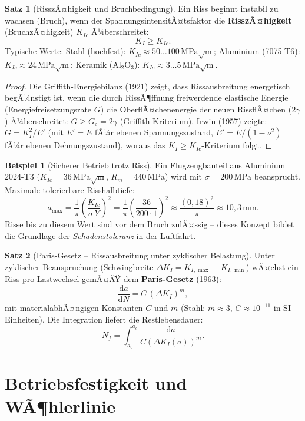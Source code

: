 ﻿\documentclass[a4paper,12pt]{report}
\theoremstyle{definition}
\newtheorem{beispiel}{Beispiel}
\newtheorem{satz}{Satz}
\begin{document}
\begin{satz}[RisszÃ¤higkeit und Bruchbedingung]
Ein Riss beginnt instabil zu wachsen (Bruch), wenn der
SpannungsintensitÃ¤tsfaktor die \textbf{RisszÃ¤higkeit} (BruchzÃ¤higkeit) $K_{Ic}$
Ã¼berschreitet:
\[
  K_I \ge K_{Ic}.
\]
Typische Werte: Stahl (hochfest): $K_{Ic} \approx 50\ldots100\,\mathrm{MPa\sqrt{m}}$;
Aluminium (7075-T6): $K_{Ic} \approx 24\,\mathrm{MPa\sqrt{m}}$;
Keramik ($\mathrm{Al_2O_3}$): $K_{Ic} \approx 3\ldots5\,\mathrm{MPa\sqrt{m}}$.
\end{satz}
\begin{proof}
Die Griffith-Energiebilanz (1921) zeigt, dass Rissausbreitung energetisch
begÃ¼nstigt ist, wenn die durch RissÃ¶ffnung freiwerdende elastische
Energie (Energiefreisetzungsrate $G$) die OberflÃ¤chenenergie der
neuen RissflÃ¤chen ($2\gamma$) Ã¼berschreitet:
$G \ge G_c = 2\gamma$ (Griffith-Kriterium).
Irwin (1957) zeigte: $G = K_I^2/E'$ (mit $E' = E$ fÃ¼r ebenen Spannungszustand,
$E' = E/(1-\nu^2)$ fÃ¼r ebenen Dehnungszustand), woraus das $K_I \ge K_{Ic}$-Kriterium folgt.
\end{proof}

\begin{beispiel}[Sicherer Betrieb trotz Riss]
Ein Flugzeugbauteil aus Aluminium 2024-T3 ($K_{Ic} = 36\,\mathrm{MPa\sqrt{m}}$,
$R_m = 440\,\mathrm{MPa}$) wird mit $\sigma = 200\,\mathrm{MPa}$ beansprucht.
Maximale tolerierbare Risshalbtiefe:
\[
  a_{\max} = \frac{1}{\pi}\left(\frac{K_{Ic}}{\sigma\,Y}\right)^2
  = \frac{1}{\pi}\left(\frac{36}{200\cdot 1}\right)^2 \approx \frac{(0{,}18)^2}{\pi} \approx 10{,}3\,\mathrm{mm}.
\]
Risse bis zu diesem Wert sind vor dem Bruch zulÃ¤ssig --
dieses Konzept bildet die Grundlage der \emph{Schadenstoleranz} in der Luftfahrt.
\end{beispiel}

\begin{satz}[Paris-Gesetz -- Rissausbreitung unter zyklischer Belastung]
Unter zyklischer Beanspruchung (Schwingbreite $\Delta K_I = K_{I,\max} - K_{I,\min}$)
wÃ¤chst ein Riss pro Lastwechsel gemÃ¤ÃŸ dem \textbf{Paris-Gesetz} (1963):
\[
  \frac{\mathrm{d}a}{\mathrm{d}N} = C\,(\Delta K_I)^m,
\]
mit materialabhÃ¤ngigen Konstanten $C$ und $m$ (Stahl: $m \approx 3$, $C \approx 10^{-11}$
in SI-Einheiten). Die Integration liefert die Restlebensdauer:
\[
  N_f = \int_{a_0}^{a_c}\frac{\mathrm{d}a}{C(\Delta K_I(a))^m}.
\]
\end{satz}

\section{Betriebsfestigkeit und WÃ¶hlerlinie}
\end{document}
